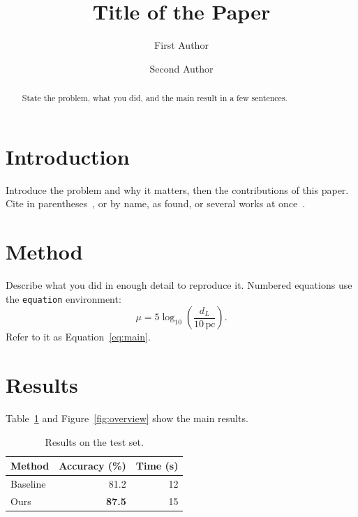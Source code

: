 \documentclass[twocolumn]{aastex701}
\begin{document}
\title{Title of the Paper}

\author[0000-0000-0000-0000]{First Author}

\author{Second Author}

\begin{abstract}
State the problem, what you did, and the main result in a few sentences.
\end{abstract}


\section{Introduction}
\label{sec:intro}
Introduce the problem and why it matters, then the contributions of this
paper. Cite in parentheses~\citep{perlmutter1999}, or by name, as \citet{planck2020} found, or several works at
once~\citep{perlmutter1999,riess1998}.

\section{Method}
\label{sec:method}
Describe what you did in enough detail to reproduce it. Numbered equations use
the \texttt{equation} environment:
\begin{equation}
  \label{eq:main}
  \mu = 5 \log_{10}\left(\frac{d_L}{10\,\mathrm{pc}}\right).
\end{equation}
Refer to it as Equation~\eqref{eq:main}.

\section{Results}
\label{sec:results}
Table~\ref{tab:results} and Figure~\ref{fig:overview} show the main results.

\begin{table}[htbp]
  \centering
  \caption{Results on the test set.}
  \label{tab:results}
  \begin{tabular}{lrr}
    \toprule
    Method & Accuracy (\%) & Time (s) \\
    \midrule
    Baseline & 81.2 & 12 \\
    Ours & \textbf{87.5} & 15 \\
    \bottomrule
  \end{tabular}
\end{table}
\end{document}

